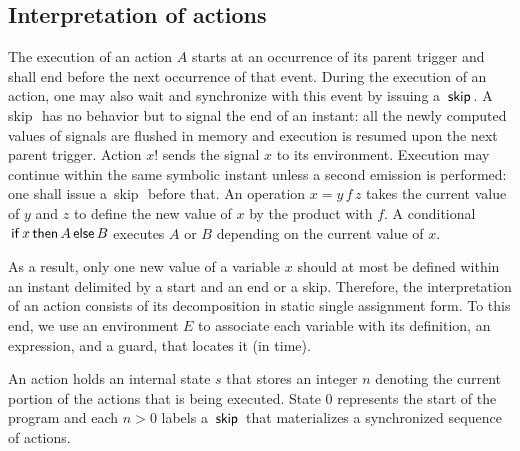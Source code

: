 \documentclass[copyright,creativecommons]{eptcs}
\newcommand{\op}[1]{{\sf #1}}
\newcommand{\kw}[1]{{{\,\op{#1}\,}}}
\renewcommand{\:}{{:}}
\newcommand{\Skip}{{\kw{skip}}}
\newcommand{\If}{{\kw{if}}}
\newcommand{\Then}{{\kw{then}}}
\newcommand{\Else}{{\kw{else}}}
\begin{document}
\subsection{Interpretation of actions}

The execution of an action $A$ starts at an occurrence of its parent trigger and shall end before the next occurrence of that event.  During the execution of an action, one may also  wait and synchronize with this event by issuing a $\Skip$.  A \Skip\ has no behavior but to signal the end of an instant: all the newly computed values of signals are flushed in memory and execution is resumed upon the next parent trigger. Action $x!$ sends the signal $x$ to its environment. Execution may continue within the same symbolic instant unless a second emission is performed: one shall issue a \Skip\ before that. An operation $x=y\,f\,z$ takes the current value of $y$ and $z$ to define the new value of $x$ by the product with $f$. A conditional $\If x \Then A \Else B$ executes $A$ or $B$ depending on the current value of $x$. 

As a result, only one new value of a variable $x$ should at most be defined within an instant delimited by a start and an end or a skip. Therefore, the interpretation of an action consists of its decomposition in static single assignment form.  To this end, we use an environment $E$ to associate each variable with its definition, an expression, and a guard, that locates it (in time).

An action holds an internal state $s$ that stores an integer $n$ denoting the current portion of the actions that is being executed. State $0$ represents the start of the program and each $n>0$ labels a $\Skip$ that materializes a synchronized sequence of actions.
\end{document}
